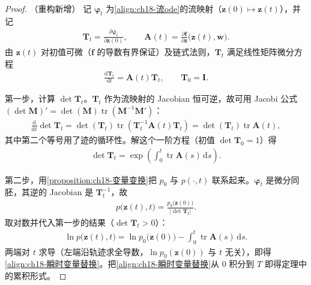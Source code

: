 \documentclass[../../main.tex]{subfiles}
\begin{document}
\begin{proof}（重构新增）
记 $\bm{\varphi}_t$ 为\eqref{align:ch18-流ode}的流映射（$\bm{z}(0)\mapsto\bm{z}(t)$），并记
\begin{align*}
  \bm{T}_t=\frac{\partial\bm{\varphi}_t}{\partial\bm{z}(0)},\qquad \bm{A}(t)=\frac{\partial\bm{f}}{\partial\bm{z}}\big(\bm{z}(t),\bm{w}\big).
\end{align*}
由 $\bm{z}(t)$ 对初值可微（$\bm{f}$ 的导数有界保证）及链式法则，$\bm{T}_t$ 满足线性矩阵微分方程
\begin{align*}
  \frac{\mathrm{d}\bm{T}_t}{\mathrm{d}t}=\bm{A}(t)\bm{T}_t,\qquad \bm{T}_0=\bm{I}.
\end{align*}

第一步，计算 $\det\bm{T}_t$。$\bm{T}_t$ 作为流映射的 Jacobian 恒可逆，故可用 Jacobi 公式 $(\det\bm{M})'=\det(\bm{M})\operatorname{tr}(\bm{M}^{-1}\bm{M}')$：
\begin{align*}
  \frac{\mathrm{d}}{\mathrm{d}t}\det\bm{T}_t=\det(\bm{T}_t)\operatorname{tr}\left(\bm{T}_t^{-1}\bm{A}(t)\bm{T}_t\right)=\det(\bm{T}_t)\operatorname{tr}\bm{A}(t),
\end{align*}
其中第二个等号用了迹的循环性。解这个一阶方程（初值 $\det\bm{T}_0=1$）得
\begin{align*}
  \det\bm{T}_t=\exp\left(\int_{0}^{t}\operatorname{tr}\bm{A}(s)\,\mathrm{d}s\right).
\end{align*}

第二步，用\cref{proposition:ch18-变量变换}把 $p_0$ 与 $p(\cdot,t)$ 联系起来。$\bm{\varphi}_t$ 是微分同胚，其逆的 Jacobian 是 $\bm{T}_t^{-1}$，故
\begin{align*}
  p\big(\bm{z}(t),t\big)=\frac{p_0\big(\bm{z}(0)\big)}{\left|\det\bm{T}_t\right|}.
\end{align*}
取对数并代入第一步的结果（$\det\bm{T}_t>0$）：
\begin{align*}
  \ln p\big(\bm{z}(t),t\big)=\ln p_0\big(\bm{z}(0)\big)-\int_{0}^{t}\operatorname{tr}\bm{A}(s)\,\mathrm{d}s .
\end{align*}
两端对 $t$ 求导（左端沿轨迹求全导数，$\ln p_0(\bm{z}(0))$ 与 $t$ 无关），即得\eqref{align:ch18-瞬时变量替换}。把\eqref{align:ch18-瞬时变量替换}从 $0$ 积分到 $T$ 即得定理中的累积形式。
\end{proof}
\end{document}
